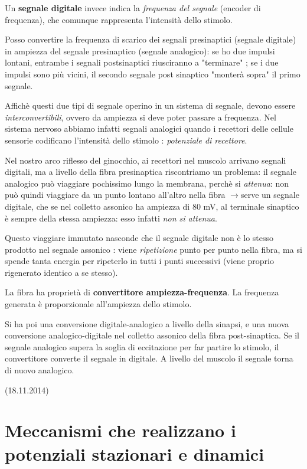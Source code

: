 \documentclass[a4paper,12pt]{article}
\newcommand{\lfreccia}{\ensuremath{\longrightarrow}}
\begin{document}
Un \textbf{segnale digitale} invece indica la \emph{frequenza del segnale} (encoder di frequenza), che comunque rappresenta l'intensità dello stimolo.

Posso convertire la frequenza di scarico dei segnali presinaptici (segnale digitale) in ampiezza del segnale presinaptico (segnale analogico): se ho due impulsi lontani, entrambe i segnali postsinaptici riusciranno a "terminare" ; se i due impulsi sono più vicini, il secondo segnale post sinaptico "monterà sopra" il primo segnale. 

Affichè questi due tipi di segnale operino in un sistema di segnale, devono essere \emph{interconvertibili}, ovvero da ampiezza si deve poter passare a frequenza. 
Nel sistema nervoso abbiamo infatti segnali analogici quando i recettori delle cellule sensorie codificano l'intensità dello stimolo : \emph{potenziale di recettore}. 

Nel nostro arco riflesso del ginocchio, ai recettori nel muscolo arrivano segnali digitali, ma a livello della fibra presinaptica riscontriamo un problema: il segnale analogico può viaggiare pochissimo lungo la membrana, perchè si \emph{attenua}: non può quindi viaggiare da un punto lontano all'altro nella fibra \lfreccia serve un segnale digitale, che se nel colletto assonico ha ampiezza di 80 mV, al terminale sinaptico è sempre della stessa ampiezza: esso infatti \emph{non si attenua}.

Questo viaggiare immutato nasconde che il segnale digitale non è lo stesso prodotto nel segnale assonico : viene \emph{ripetizione} punto per punto nella fibra, ma si spende tanta energia per ripeterlo in tutti i punti successivi (viene proprio rigenerato identico a se stesso).

La fibra ha proprietà di \textbf{convertitore ampiezza-frequenza}. La frequenza generata è proporzionale all'ampiezza dello stimolo.

Si ha poi una conversione digitale-analogico a livello della sinapsi, e una nuova conversione analogico-digitale nel colletto assonico della fibra post-sinaptica. Se il segnale analogico supera la soglia di eccitazione per far partire lo stimolo, il convertitore converte il segnale in digitale. A livello del muscolo il segnale torna di nuovo analogico.

(18.11.2014)

\section{Meccanismi che realizzano i potenziali stazionari e dinamici}
\end{document}
